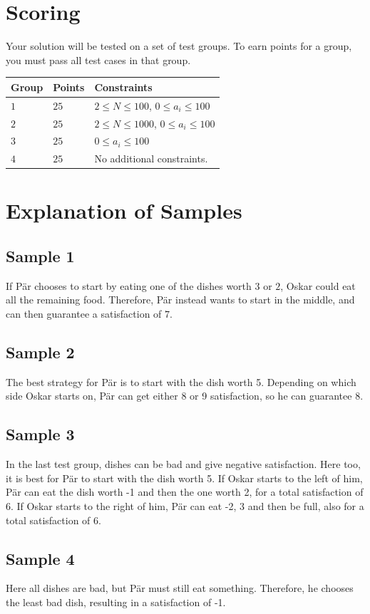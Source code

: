 \section*{Scoring}
Your solution will be tested on a set of test groups. To earn points for a group, you must pass all test cases in that group.

\noindent
\begin{tabular}{| l | l | p{12cm} |}
  \hline
  \textbf{Group} & \textbf{Points} & \textbf{Constraints} \\ \hline
  $1$    & $25$      & $2 \le N \le 100$, $0 \le a_i \le 100$ \\ \hline
  $2$    & $25$      & $2 \le N \le 1000$, $0 \le a_i \le 100$ \\ \hline
  $3$    & $25$      & $0 \le a_i \le 100$ \\ \hline
  $4$    & $25$      & No additional constraints.  \\ \hline
\end{tabular}

\section*{Explanation of Samples}
\subsection*{Sample 1}
If Pär chooses to start by eating one of the dishes worth $3$ or $2$, Oskar could eat all the remaining food. Therefore, Pär instead wants to start in the middle, and can then guarantee a satisfaction of $7$.
\subsection*{Sample 2}
The best strategy for Pär is to start with the dish worth 5. Depending on which side Oskar starts on, Pär can get either 8 or 9 satisfaction, so he can guarantee 8.
\subsection*{Sample 3}
In the last test group, dishes can be bad and give negative satisfaction. Here too, it is best for Pär to start with the dish worth 5. If Oskar starts to the left of him, Pär can eat the dish worth -1 and then the one worth 2, for a total satisfaction of 6. If Oskar starts to the right of him, Pär can eat -2, 3 and then be full, also for a total satisfaction of 6.
\subsection*{Sample 4}
Here all dishes are bad, but Pär must still eat something. Therefore, he chooses the least bad dish, resulting in a satisfaction of -1.
